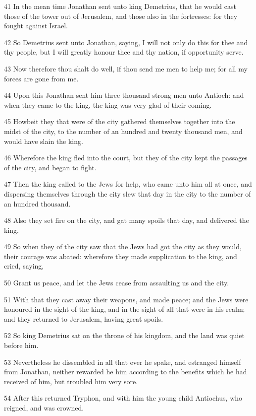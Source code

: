 \par 41 In the mean time Jonathan sent unto king Demetrius, that he would cast those of the tower out of Jerusalem, and those also in the fortresses: for they fought against Israel.
\par 42 So Demetrius sent unto Jonathan, saying, I will not only do this for thee and thy people, but I will greatly honour thee and thy nation, if opportunity serve.
\par 43 Now therefore thou shalt do well, if thou send me men to help me; for all my forces are gone from me.
\par 44 Upon this Jonathan sent him three thousand strong men unto Antioch: and when they came to the king, the king was very glad of their coming.
\par 45 Howbeit they that were of the city gathered themselves together into the midst of the city, to the number of an hundred and twenty thousand men, and would have slain the king.
\par 46 Wherefore the king fled into the court, but they of the city kept the passages of the city, and began to fight.
\par 47 Then the king called to the Jews for help, who came unto him all at once, and dispersing themselves through the city slew that day in the city to the number of an hundred thousand.
\par 48 Also they set fire on the city, and gat many spoils that day, and delivered the king.
\par 49 So when they of the city saw that the Jews had got the city as they would, their courage was abated: wherefore they made supplication to the king, and cried, saying,
\par 50 Grant us peace, and let the Jews cease from assaulting us and the city.
\par 51 With that they cast away their weapons, and made peace; and the Jews were honoured in the sight of the king, and in the sight of all that were in his realm; and they returned to Jerusalem, having great spoils.
\par 52 So king Demetrius sat on the throne of his kingdom, and the land was quiet before him.
\par 53 Nevertheless he dissembled in all that ever he spake, and estranged himself from Jonathan, neither rewarded he him according to the benefits which he had received of him, but troubled him very sore.
\par 54 After this returned Tryphon, and with him the young child Antiochus, who reigned, and was crowned.
